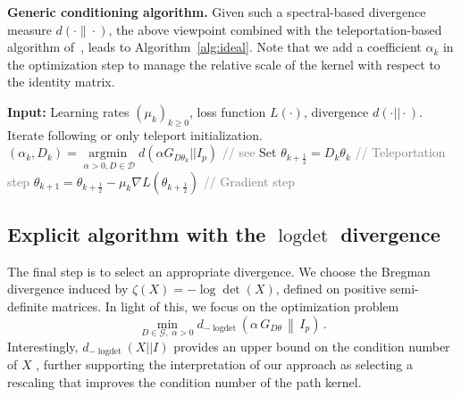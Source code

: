 \documentclass{article}
\theoremstyle{plain}
\theoremstyle{definition}
\theoremstyle{remark}
\newcommand{\algcomment}[1]{\hfill{\footnotesize\textcolor{gray}{// #1}}}
\def\Dcal{\mathcal{D}}
\def\logdet{\operatorname{logdet}}
\def\Dcal{{\mathcal{D}}}
\newcommand{\argmin}[1]{{\underset{#1}{\operatorname{argmin} \ }}}
\begin{document}
{\textbf{Generic conditioning algorithm.} Given such a spectral-based divergence measure $d(\cdot \|\cdot)$, the above viewpoint 
combined with the teleportation-based algorithm of~\citet{zhao2022symmetry}, leads to Algorithm~\ref{alg:ideal}. Note that we add a coefficient 
$\alpha_{k}$ in the optimization step to manage the relative scale of the kernel with respect to the identity matrix.



\begin{algorithm}[t]
    \caption{Idealized Rescaling Algorithm}
    \label{alg:ideal}
    \begin{algorithmic}[1]
      \STATE \textbf{Input:} Learning rates $(\mu_k)_{k \geq 0}$, loss function $L(\cdot)$, divergence $d(\cdot || \cdot)$.
    \STATE Iterate following or only teleport initialization.
          \STATE $(\alpha_{k},D_{k}) \! = \!\! \argmin{\alpha>0, D \in \Dcal}
d(\alpha G_{D\theta_{k}}|| I_{p})
          $ \algcomment{see }
          \STATE Set $\theta_{k+\frac{1}{2}} = D_k \theta_k$ \hfill \algcomment{Teleportation step}
          \STATE $\theta_{k+1} = \theta_{k+\frac{1}{2}} - \mu_k \nabla L(\theta_{k+\frac{1}{2}})$ \hfill \algcomment{Gradient step}
      \ENDFOR
    \end{algorithmic}
\end{algorithm}

\subsection{Explicit algorithm with the $\logdet$ divergence} \label{subsec:algo}

The final step is to select an appropriate divergence. We choose the Bregman divergence induced by $\zeta(X) = -\log\det(X)$, 
defined on positive semi-definite matrices. In light of this, we focus on the optimization problem
\begin{equation}
\label{eq:div_logdet}
\min_{D \in \mathcal{G},\;\alpha > 0}
    d_{-\logdet}\!\left(\alpha\, G_{D\theta}\,\middle\|\, I_p\right)\,.
\end{equation}
Interestingly, $d_{-\logdet}(X||I)$ provides an upper bound on the condition number 
of $X$ \citep{dhillon2008log, bock2025connectingkaporinsconditionnumber}, further supporting the interpretation of our approach as selecting a rescaling that improves the condition number of the path kernel.

}
\end{document}
